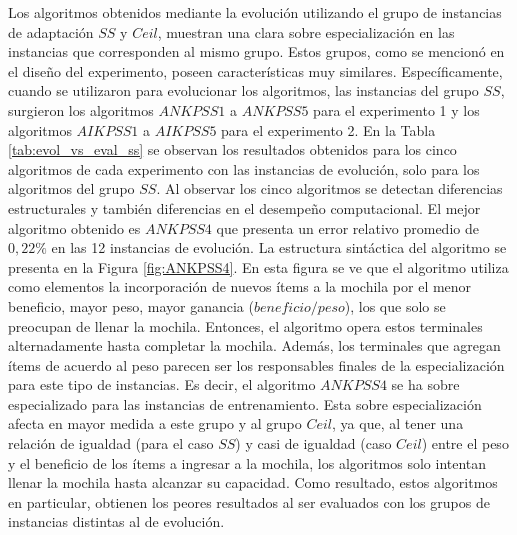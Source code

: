 Los algoritmos obtenidos mediante la evolución utilizando el grupo de instancias de adaptación $SS$ y $Ceil$, muestran una clara sobre especialización en las instancias que corresponden al mismo grupo. Estos grupos, como se mencionó en el diseño del experimento, poseen características muy similares. Específicamente, cuando se utilizaron para evolucionar los algoritmos, las instancias del grupo $SS$, surgieron los algoritmos $ANKPSS1$ a $ANKPSS5$ para el experimento 1 y los algoritmos $AIKPSS1$ a $AIKPSS5$ para el experimento 2. En la Tabla \ref{tab:evol_vs_eval_ss} se observan los resultados obtenidos para los cinco algoritmos de cada experimento con las instancias de evolución, solo para los algoritmos del grupo $SS$. Al observar los cinco algoritmos se detectan diferencias estructurales y también diferencias en el desempeño computacional. El mejor algoritmo obtenido es $ANKPSS4$ que presenta un error relativo promedio de $0,22\%$ en las 12 instancias de evolución. La estructura sintáctica del algoritmo se presenta en la Figura \ref{fig:ANKPSS4}. En esta figura se ve que el algoritmo utiliza como elementos la incorporación de nuevos ítems a la mochila por el menor beneficio, mayor peso, mayor ganancia ($beneficio / peso$), los que solo se preocupan de llenar la mochila. Entonces, el algoritmo opera estos terminales alternadamente hasta completar la mochila. Además, los terminales que agregan ítems de acuerdo al peso parecen ser los responsables finales de la especialización para este tipo de instancias. Es decir, el algoritmo $ANKPSS4$ se ha sobre especializado para las instancias de entrenamiento. Esta sobre especialización afecta en mayor medida a este grupo y al grupo $Ceil$, ya que, al tener una relación de igualdad (para el caso $SS$) y casi de igualdad (caso $Ceil$) entre el peso y el beneficio de los ítems a ingresar a la mochila, los algoritmos solo intentan llenar la mochila hasta alcanzar su capacidad. Como resultado, estos algoritmos en particular, obtienen los peores resultados al ser evaluados con los grupos de instancias distintas al de evolución.

